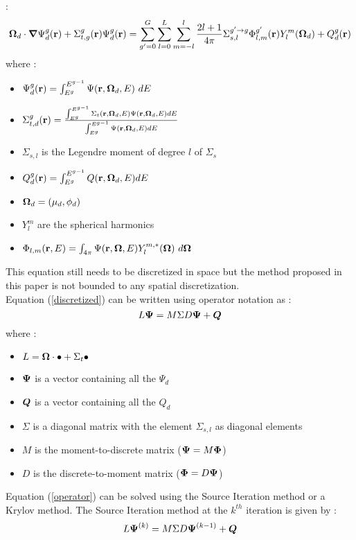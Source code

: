 \cite{reuss} :
\begin{equation}
\boldsymbol{\Omega}_d \cdot \boldsymbol{\nabla} \Psi_d^g(\mathbf{r}) + \Sigma_{t,g}^g(\mathbf{r}) \Psi_d^g(\mathbf{r}) = \sum_{g'=0}^G
\sum_{l=0}^L\sum_{m=-l}^l \frac{2l+1}{4\pi}\Sigma_{s,l}^{g'\rightarrow
g}\Phi_{l,m}^{g'}(\mathbf{r})Y_l^m(\boldsymbol{\Omega}_d) + Q_d^g(\mathbf{r})
\label{discretized}
\end{equation}
where :
\begin{itemize}
\item $\Psi_d^g(\br)=\int_{E^{g}}^{E^{g-1}}\Psi(\br,\bo_d,E)\ dE$
\item $\Sigma_{t,d}^g(\mathbf{r}) = \frac{\int_{E^{g}}^{E^{g-1}}\Sigma_t(\mathbf{r},\boldsymbol{\Omega}_d,E)
\Psi(\mathbf{r},\boldsymbol{\Omega}_d,E) dE}{\int_{E^g}^{E^{g-1}}\Psi(\mathbf{r},\boldsymbol{\Omega}_d,E) dE}$
\item $\Sigma_{s,l}$ is the Legendre moment of degree $l$ of $\Sigma_s$
\item $Q_d^g(\mathbf{r}) = \int_{E^g}^{E^{g-1}}Q(\mathbf{r},\boldsymbol{\Omega}_d,E) dE$
\item $\boldsymbol{\Omega}_d = (\mu_d,\phi_d)$
\item $Y_l^m$ are the spherical harmonics
\item $\Phi_{l,m}(\mathbf{r},E)= \int_{4\pi}\Psi(\mathbf{r},\boldsymbol{\Omega},E)Y_l^{m,*}(\boldsymbol{\Omega})\ d\boldsymbol{\Omega}$
\end{itemize}
This equation still needs to be discretized in space but the method proposed
in this paper is not bounded to any spatial discretization.\\ 
Equation (\ref{discretized}) can be written using operator notation as :
\begin{equation}
L \boldsymbol{\Psi} = M\Sigma D \boldsymbol{\Psi} + \boldsymbol{Q}
\label{operator}
\end{equation}
where :
\begin{itemize}
\item $L = \boldsymbol{\Omega}\cdot \bullet + \Sigma_t \bullet$
\item $\boldsymbol{\Psi}$ is a vector containing all the $\Psi_d$
\item $\boldsymbol{Q}$ is a vector containing all the $Q_d$
\item $\Sigma$ is a diagonal matrix with the element $\Sigma_{s,l}$ as
diagonal elements
\item $M$ is the moment-to-discrete matrix ($\boldsymbol{\Psi}=M\boldsymbol{\Phi}$)
\item $D$ is the discrete-to-moment matrix ($\boldsymbol{\Phi}=D\boldsymbol{\Psi}$)
\end{itemize}
Equation (\ref{operator}) can be solved using the Source Iteration method or a
Krylov method. The Source Iteration method at the $k^{th}$ iteration is given
by :
\begin{equation}
L\boldsymbol{\Psi}^{(k)} = M\Sigma D \boldsymbol{\Psi}^{(k-1)} + \boldsymbol{Q}
\end{equation}
